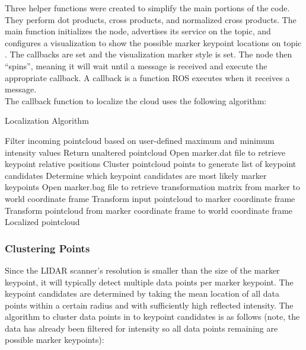 Three helper functions were created to simplify the main portions of the code. They perform dot products, cross products, and normalized cross products. The main function initializes the node, advertises its service on the  topic, and configures a visualization to show the possible marker keypoint locations on topic . The  callbacks are set and the visualization marker style is set. The node then ``spins'', meaning it will wait until a message is received and execute the appropriate callback. A callback is a function ROS executes when it receives a message.\\

The callback function to localize the cloud uses the following algorithm:
\begin{algorithm}[H]
\caption{Localization Algorithm}
\label{alg:localize}
\begin{algorithmic}[1]
\begin{raggedright}
\State Filter incoming pointcloud based on user-defined maximum and minimum intensity values
\State Return unaltered pointcloud
\Else
\State Open marker.dat file to retrieve keypoint relative positions
\State Cluster pointcloud points to generate list of keypoint candidates
\State Determine which keypoint candidates are most likely marker keypoints
\State Open marker.bag file to retrieve transformation matrix from marker to world coordinate frame
\State Transform input pointcloud to marker coordinate frame
\State Transform pointcloud from marker coordinate frame to world coordinate frame \EndIf
\EndFunction\\
\Return Localized pointcloud
\end{raggedright}
\end{algorithmic}
\end{algorithm}

\subsubsection{Clustering Points}
Since the LIDAR scanner's resolution is smaller than the size of the marker keypoint, it will typically detect multiple data points per marker keypoint. The keypoint candidates are determined by taking the mean location of all data points within a certain radius and with sufficiently high reflected intensity. The algorithm to cluster data points in to keypoint candidates is as follows (note, the data has already been filtered for intensity so all data points remaining are possible marker keypoints):

